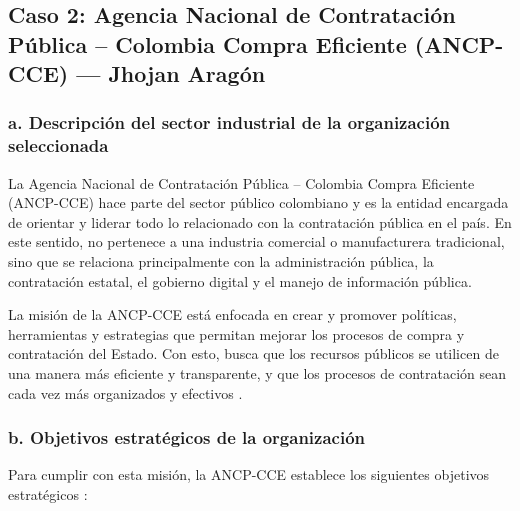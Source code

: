 \subsection{Caso 2: Agencia Nacional de Contratación Pública – Colombia Compra Eficiente (ANCP-CCE) --- Jhojan Aragón}

\subsubsection{a. Descripción del sector industrial de la organización seleccionada}
La Agencia Nacional de Contratación Pública – Colombia Compra Eficiente (ANCP-CCE) hace parte del sector público colombiano y es la entidad encargada de orientar y liderar todo lo relacionado con la contratación pública en el país. En este sentido, no pertenece a una industria comercial o manufacturera tradicional, sino que se relaciona principalmente con la administración pública, la contratación estatal, el gobierno digital y el manejo de información pública.

La misión de la ANCP-CCE está enfocada en crear y promover políticas, herramientas y estrategias que permitan mejorar los procesos de compra y contratación del Estado. Con esto, busca que los recursos públicos se utilicen de una manera más eficiente y transparente, y que los procesos de contratación sean cada vez más organizados y efectivos \parencite{ancp2023plan}.

\subsubsection{b. Objetivos estratégicos de la organización}
Para cumplir con esta misión, la ANCP-CCE establece los siguientes objetivos estratégicos \parencite{ancpObjetivos}:

